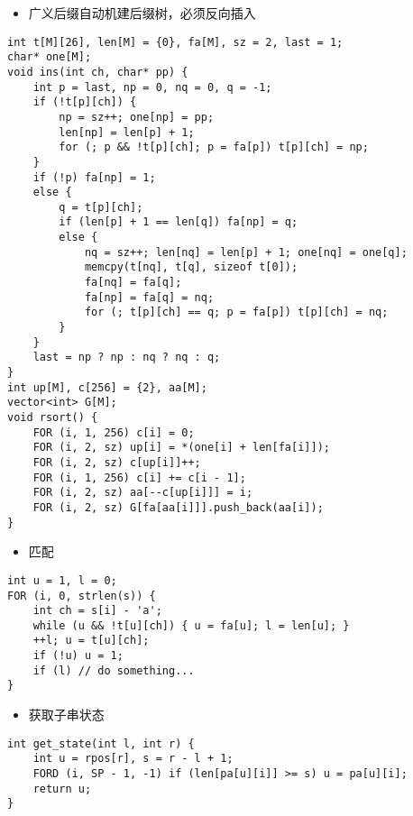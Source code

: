 \documentclass[]{article}
\providecommand{\tightlist}{%
  \setlength{\itemsep}{0pt}\setlength{\parskip}{0pt}}
\begin{document}
\begin{itemize}
\tightlist
\item
  广义后缀自动机建后缀树，必须反向插入
\end{itemize}

\begin{verbatim}
int t[M][26], len[M] = {0}, fa[M], sz = 2, last = 1;
char* one[M];
void ins(int ch, char* pp) {
    int p = last, np = 0, nq = 0, q = -1;
    if (!t[p][ch]) {
        np = sz++; one[np] = pp;
        len[np] = len[p] + 1;
        for (; p && !t[p][ch]; p = fa[p]) t[p][ch] = np;
    }
    if (!p) fa[np] = 1;
    else {
        q = t[p][ch];
        if (len[p] + 1 == len[q]) fa[np] = q;
        else {
            nq = sz++; len[nq] = len[p] + 1; one[nq] = one[q];
            memcpy(t[nq], t[q], sizeof t[0]);
            fa[nq] = fa[q];
            fa[np] = fa[q] = nq;
            for (; t[p][ch] == q; p = fa[p]) t[p][ch] = nq;
        }
    }
    last = np ? np : nq ? nq : q;
}
int up[M], c[256] = {2}, aa[M];
vector<int> G[M];
void rsort() {
    FOR (i, 1, 256) c[i] = 0;
    FOR (i, 2, sz) up[i] = *(one[i] + len[fa[i]]);
    FOR (i, 2, sz) c[up[i]]++;
    FOR (i, 1, 256) c[i] += c[i - 1];
    FOR (i, 2, sz) aa[--c[up[i]]] = i;
    FOR (i, 2, sz) G[fa[aa[i]]].push_back(aa[i]);
}
\end{verbatim}

\begin{itemize}
\tightlist
\item
  匹配
\end{itemize}

\begin{verbatim}
int u = 1, l = 0;
FOR (i, 0, strlen(s)) {
    int ch = s[i] - 'a';
    while (u && !t[u][ch]) { u = fa[u]; l = len[u]; }
    ++l; u = t[u][ch];
    if (!u) u = 1;
    if (l) // do something...
}
\end{verbatim}

\begin{itemize}
\tightlist
\item
  获取子串状态
\end{itemize}

\begin{verbatim}
int get_state(int l, int r) {
    int u = rpos[r], s = r - l + 1;
    FORD (i, SP - 1, -1) if (len[pa[u][i]] >= s) u = pa[u][i];
    return u;
}
\end{verbatim}
\end{document}
